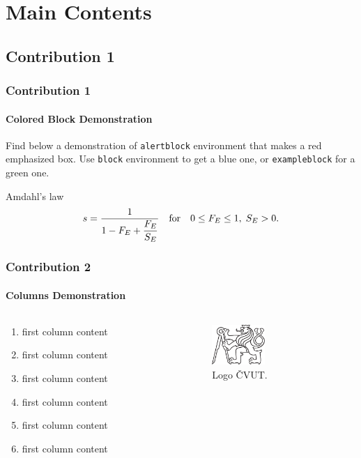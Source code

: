 \documentclass[a4paper]{beamer}
\begin{document}
\section{Main Contents}
\subsection*{Contribution 1}
\begin{frame}
\frametitle{Contribution 1}
\framesubtitle{Colored Block Demonstration}
Find below a demonstration of {\tt alertblock} environment that makes a red emphasized box. Use {\tt block} environment to get a blue one, or {\tt exampleblock} for a green one.
\begin{alertblock}{Amdahl's law}
\begin{equation}
s=\frac{1}{1-F_E+\displaystyle\frac{F_E}{S_E}}\quad {\rm for}\quad 0\leq F_E\leq 1,\;S_E>0.
\end{equation}
\end{alertblock}
\end{frame}

\begin{frame}
\frametitle{Contribution 2}
\framesubtitle{Columns Demonstration}
\begin{columns}
\begin{column}[t]{4cm}
\begin{enumerate}
\item first column content
\item first column content
\item first column content
\item first column content
\item first column content
\item first column content
\end{enumerate}
\end{column}
\begin{column}[t]{6cm}
\begin{figure}[htb]
\begin{center}
\includegraphics[width=2cm]{pic/LogoCVUT.pdf}
\end{center}
\caption{Logo \v{C}VUT.}
\end{figure}
\end{column}
\end{columns}
\end{frame}
\end{document}
